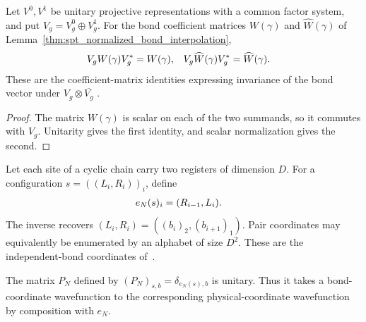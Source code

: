 \begin{lemma}
    \label{thm:spt_bond_interpolation_symmetry}
    \leanok
    Let $V^0,V^1$ be unitary projective representations with a common
    factor system, and put $V_g=V_g^0\oplus V_g^1$.  For the bond coefficient
    matrices $W(\gamma)$ and $\widehat W(\gamma)$ of
    Lemma~\ref{thm:spt_normalized_bond_interpolation},
    \begin{align}
        V_gW(\gamma)V_g^*          & = W(\gamma),          &
        V_g\widehat W(\gamma)V_g^* & = \widehat W(\gamma).
        \notag
    \end{align}
    These are the coefficient-matrix identities expressing invariance of
    the bond vector under $V_g\otimes\overline{V_g}$
    \cite[Section~II.F.2]{Schuch2011Phases}.
\end{lemma}

\begin{proof}\leanok
    The matrix $W(\gamma)$ is scalar on each of the two summands, so it
    commutes with $V_g$.  Unitarity gives the first identity, and scalar
    normalization gives the second.
\end{proof}

\begin{definition}
    \label{def:spt_incoming_bond_coordinates}
    \leanok
    Let each site of a cyclic chain carry two registers of dimension $D$.
    For a configuration $s=((L_i,R_i))_i$, define
    \begin{align}
        e_N(s)_i & = (R_{i-1},L_i).
        \notag
    \end{align}
    The inverse recovers $(L_i,R_i)=((b_i)_2,(b_{i+1})_1)$.
    Pair coordinates may equivalently be enumerated by an alphabet of
    size $D^2$.  These are the independent-bond coordinates
    of~\cite[Section~II.D.2]{Schuch2011Phases}.
\end{definition}

\begin{lemma}
    \label{thm:spt_incoming_bond_unitary}
    \leanok
    The matrix $P_N$ defined by $(P_N)_{s,b}=\delta_{e_N(s),b}$ is unitary.
    Thus it takes a bond-coordinate wavefunction to the corresponding
    physical-coordinate wavefunction by composition with $e_N$.
\end{lemma}

